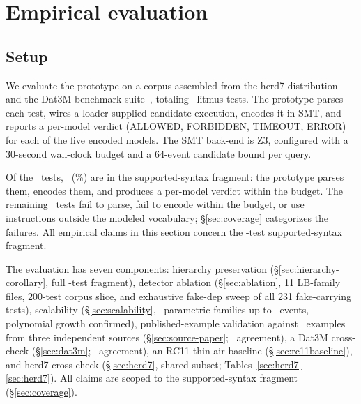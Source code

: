 \documentclass{llncs}
\begin{document}
\section{Empirical evaluation}
\label{sec:evaluation}

\subsection{Setup}
\label{sec:setup}

We evaluate the prototype on a corpus assembled from the herd7
distribution~\cite{alglave2014herding} and the Dat3M benchmark
suite~\cite{gavrilenko2019bmc}, totaling \CorpusFilesTotal~litmus tests. The prototype
parses each test, wires a loader-supplied candidate execution, encodes it in
SMT, and reports a per-model verdict (ALLOWED, FORBIDDEN, TIMEOUT, ERROR) for each of the five
encoded models. The SMT back-end is Z3, configured with a 30-second wall-clock
budget and a 64-event candidate bound per query.

Of the \CorpusFilesTotal~tests, \CorpusSize~(\CoveragePercent\%) are in the
supported-syntax fragment: the prototype parses them, encodes them, and produces a
per-model verdict within the budget. The remaining \UnsupportedFiles~tests fail to
parse, fail to encode within the budget, or use instructions outside the modeled
vocabulary; \S\ref{sec:coverage} categorizes the failures. All empirical
claims in this section concern the \CorpusSize-test supported-syntax fragment.

The evaluation has seven components: hierarchy preservation
(\S\ref{sec:hierarchy-corollary}, full \CorpusSize-test fragment), detector
ablation (\S\ref{sec:ablation}, 11 LB-family files, 200-test corpus
slice, and exhaustive fake-dep sweep of all 231 fake-carrying tests),
scalability (\S\ref{sec:scalability}, \ScalabilityFamilies~parametric families up to
\ScalabilityMaxEvents~events, polynomial growth confirmed), published-example validation
against \PublishedExampleTotal~examples from three independent sources
(\S\ref{sec:source-paper}; \PublishedExampleAgreement~agreement), a Dat3M
cross-check (\S\ref{sec:dat3m}; \DatThreeMagreement~agreement), an RC11
thin-air baseline (\S\ref{sec:rc11baseline}), and
herd7 cross-check (\S\ref{sec:herd7},
shared subset; Tables~\ref{sec:herd7}--\ref{sec:herd7}). All
claims are scoped to the supported-syntax fragment
(\S\ref{sec:coverage}).
\end{document}
